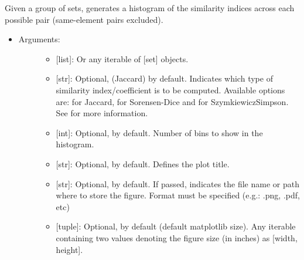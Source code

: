 \documentclass[letterpaper,10pt,english]{sphinxmanual}
\begin{document}
\begin{fulllineitems}
\label{\detokenize{plots:data_tools.plots.similarity_histogram}}
Given a group of sets, generates a histogram of the similarity
indices across each possible pair (same-element pairs excluded).
\begin{itemize}
\item {} \begin{description}
\item[{Arguments:}] \leavevmode\begin{itemize}
\item {} 
 {[}list{]}: Or any iterable of {[}set{]} objects.

\item {} 
 {[}str{]}: Optional,  (Jaccard) by default.
Indicates which type of similarity index/coefficient is to be
computed. Available options are:  for Jaccard, 
for Sorensen-Dice and  for Szymkiewicz\textendash{}Simpson. See
{\hyperref[\detokenize{iterables:data_tools.iterables.similarity}]{}} for more
information.

\item {} 
 {[}int{]}: Optional,  by default. Number of bins to
show in the histogram.

\item {} 
 {[}str{]}: Optional,  by default. Defines the plot
title.

\item {} 
 {[}str{]}: Optional,  by default. If passed,
indicates the file name or path where to store the figure.
Format must be specified (e.g.: .png, .pdf, etc)

\item {} 
 {[}tuple{]}: Optional,  by default (default
matplotlib size). Any iterable containing two values denoting
the figure size (in inches) as {[}width, height{]}.


\end{itemize}
\end{description}
\end{itemize}
\end{fulllineitems}
\end{document}
